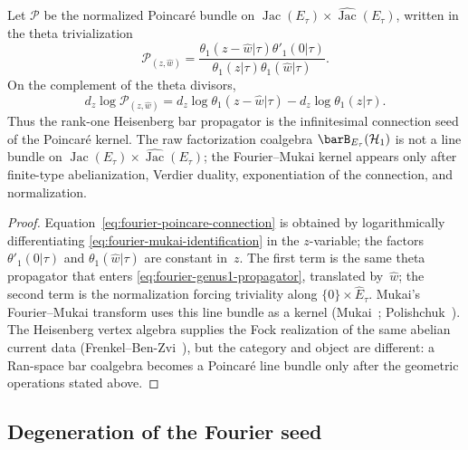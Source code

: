 \begin{proposition}
\label{prop:fourier-mukai-identification}
Let $\mathcal{P}$ be the normalized Poincar\'e bundle on
$\operatorname{Jac}(E_\tau) \times
\widehat{\operatorname{Jac}}(E_\tau)$, written in the theta
trivialization
\begin{equation}\label{eq:fourier-mukai-identification}
\mathcal{P}_{(z,\hat w)}
=\frac{\theta_1(z-\hat w|\tau)\theta'_1(0|\tau)}
{\theta_1(z|\tau)\theta_1(\hat w|\tau)} .
\end{equation}
On the complement of the theta divisors,
\begin{equation}\label{eq:fourier-poincare-connection}
d_z\log\mathcal{P}_{(z,\hat w)}
=d_z\log\theta_1(z-\hat w|\tau)
-d_z\log\theta_1(z|\tau).
\end{equation}
Thus the rank-one Heisenberg bar propagator is the infinitesimal
connection seed of the Poincar\'e kernel. The raw factorization
coalgebra $\barB_{E_\tau}(\mathcal{H}_1)$ is not a line bundle on
$\operatorname{Jac}(E_\tau)\times\widehat{\operatorname{Jac}}(E_\tau)$;
the Fourier--Mukai kernel appears only after finite-type abelianization,
Verdier duality, exponentiation of the connection, and normalization.
\end{proposition}

\begin{proof}
Equation~\eqref{eq:fourier-poincare-connection} is obtained by
logarithmically differentiating
\eqref{eq:fourier-mukai-identification} in the $z$-variable; the
factors $\theta'_1(0|\tau)$ and $\theta_1(\hat w|\tau)$ are constant
in~$z$. The first term is the same theta propagator that enters
\eqref{eq:fourier-genus1-propagator}, translated by~$\hat w$; the
second term is the normalization forcing triviality along
$\{0\}\times\widehat{E}_\tau$.
Mukai's Fourier--Mukai transform uses this line bundle as a kernel
(Mukai~\cite{Muk81}; Polishchuk~\cite{Pol03}). The Heisenberg vertex
algebra supplies the Fock realization of the same abelian current
data (Frenkel--Ben-Zvi~\cite{FBZ04}), but the category and object are
different: a Ran-space bar coalgebra becomes a Poincar\'e line bundle
only after the geometric operations stated above.
\end{proof}

\subsection*{Degeneration of the Fourier seed}
\label{subsec:fourier-degeneration}

